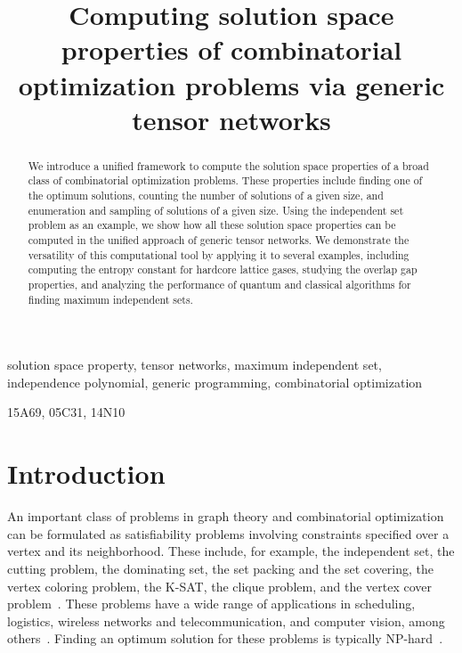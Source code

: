 \documentclass[review, onefignum, onetabnum]{siamart190516}
\title{Computing solution space properties of combinatorial optimization problems via generic tensor networks}
\begin{document}
\maketitle

\begin{abstract}
We introduce a unified framework to compute the solution space properties of a broad class of combinatorial optimization problems. These properties include finding one of the optimum solutions, counting the number of solutions of a given size, and enumeration and sampling of solutions of a given size. Using the independent set problem as an example, we show how all these solution space properties can be computed in the unified approach of generic tensor networks. We demonstrate the versatility of this computational tool by applying it to several  examples, including computing the entropy constant for hardcore lattice gases, studying the overlap gap properties, and analyzing the performance of quantum and classical algorithms for finding maximum independent sets.
\end{abstract}

\begin{keywords}
solution space property, tensor networks, maximum independent set, independence polynomial, generic programming, combinatorial optimization 
\end{keywords}

\begin{AMS}
  15A69, 05C31, 14N10
\end{AMS}

\section{Introduction}

An important class of problems in graph theory and combinatorial optimization  can be formulated as satisfiability problems involving constraints specified over a vertex and its neighborhood.
These include, for example, the independent set, the cutting problem, the dominating set, the set packing and  the set covering, the vertex coloring problem, the K-SAT,  the clique problem, and the vertex cover problem~\cite{Moore2011}.
These problems have a wide range of applications in scheduling, logistics,
wireless networks and telecommunication, and computer vision, among others~\cite{Butenko2003, Wu2015}.
Finding an optimum solution for these problems is typically NP-hard~\cite{Hastad1996}.
\end{document}
